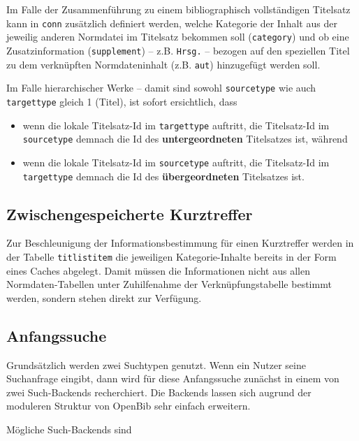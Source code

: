 \documentclass[11pt, twoside, a4paper, BCOR8mm, DIV12, bibtotoc,idxtotoc]{scrbook}
\begin{document}
Im Falle der Zusammenführung zu einem bibliographisch vollständigen
Titelsatz kann in \texttt{conn} zusätzlich definiert werden,
welche Kategorie der Inhalt aus der jeweilig anderen Normdatei im
Titelsatz bekommen soll (\texttt{category}) und ob eine
Zusatzinformation (\texttt{supplement}) -- z.B. \texttt{Hrsg.} --
bezogen auf den speziellen Titel zu dem verknüpften Normdateninhalt
(z.B.  \texttt{aut}) hinzugefügt werden soll.

Im Falle hierarchischer Werke -- damit sind sowohl \texttt{sourcetype}
wie auch \texttt{targettype} gleich 1 (Titel), ist sofort ersichtlich,
dass

\begin{itemize}
\item wenn die lokale Titelsatz-Id im \texttt{targettype} auftritt,
  die Titelsatz-Id im \texttt{sourcetype} demnach die Id des
  \textbf{untergeordneten} Titelsatzes ist, während
\item wenn die lokale Titelsatz-Id im \texttt{sourcetype} auftritt,
  die Titelsatz-Id im \texttt{targettype} demnach die Id des
  \textbf{übergeordneten} Titelsatzes ist.
\end{itemize}


\subsection{Zwischengespeicherte Kurztreffer}

Zur Beschleunigung der Informationsbestimmung für einen Kurztreffer
werden in der Tabelle \texttt{titlistitem} die jeweiligen
Kategorie-Inhalte bereits in der Form eines Caches abgelegt. Damit
müssen die Informationen nicht aus allen Normdaten-Tabellen unter
Zuhilfenahme der Ver\-knüp\-fungs\-tabelle bestimmt werden, sondern stehen
direkt zur Verfügung.

\subsection{Anfangssuche}


Grundsätzlich werden zwei Suchtypen genutzt. Wenn ein Nutzer seine
Suchanfrage eingibt, dann wird für diese Anfangssuche zunächst in
einem von zwei Such-Backends recherchiert. Die Backends lassen sich
augrund der moduleren Struktur von OpenBib sehr einfach erweitern.

Mögliche Such-Backends sind 
\end{document}
